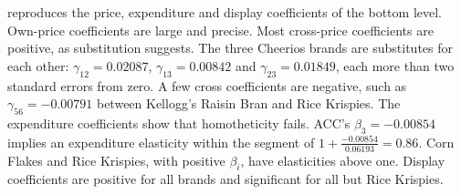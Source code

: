  reproduces the price, expenditure and display coefficients of the bottom level.
Own-price coefficients are large and precise. Most cross-price coefficients are positive, as substitution
suggests. The three Cheerios brands are substitutes for each other: $\gamma_{12} = 0.02087$,
$\gamma_{13} = 0.00842$ and $\gamma_{23} = 0.01849$, each more than two standard errors from zero. A few cross
coefficients are negative, such as $\gamma_{56} = -0.00791$ between Kellogg's Raisin Bran and Rice Krispies.
The expenditure coefficients show that homotheticity fails. ACC's $\beta_3 = -0.00854$ implies an
expenditure elasticity within the segment of $1 + \frac{-0.00854}{0.06193} = 0.86$. Corn Flakes and Rice
Krispies, with positive $\beta_i$, have elasticities above one. Display coefficients are positive for all brands
and significant for all but Rice Krispies.

